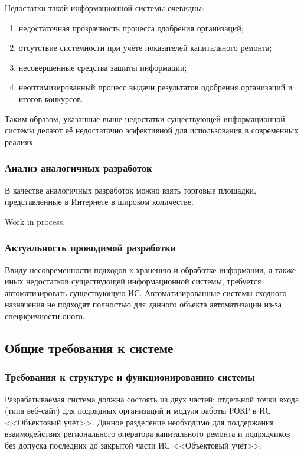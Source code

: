 Недостатки такой информационной системы очевидны:

\begin{enumerate}
	\item недостаточная прозрачность процесса одобрения организаций;
	\item отсутствие системности при учёте показателей капитального ремонта;
	\item несовершенные средства защиты информации;
	\item неоптимизированный процесс выдачи результатов одобрения организаций и итогов конкурсов.
\end{enumerate}

Таким образом, указанные выше недостатки существующей информационной системы делают её недостаточно эффективной для использования в современных реалиях.

\subsubsection{Анализ аналогичных разработок}

В качестве аналогичных разработок можно взять торговые площадки, представленные в Интернете в широком количестве.

Work in process.

\subsubsection{Актуальность проводимой разработки}

Ввиду несовременности подходов к хранению и обработке информации, а также иных недостатков существующей информационной системы, требуется автоматизировать существующую ИС.
Автоматизированные системы сходного назначения не подходят полностью для данного объекта автоматизации из-за специфичности оного.

\subsection{Общие требования к системе}

\subsubsection{Требования к структуре и функционированию системы}

Разрабатываемая система должна состоять из двух частей: отдельной точки входа (типа веб-сайт) для подрядных организаций и модуля работы РОКР в ИС <<Объектовый учёт>>.
Данное разделение необходимо для поддержания взаимодействия регионального оператора капитального ремонта и подрядчиков без допуска последних до закрытой части ИС <<Объектовый учёт>>.

